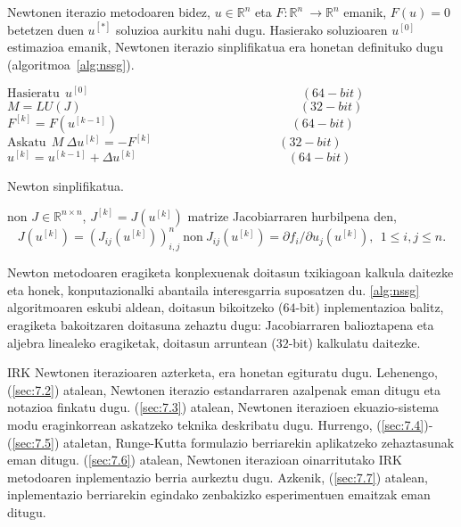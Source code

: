 Newtonen iterazio metodoaren bidez, $u\in \mathbb{R}^{n}$ eta $F: \mathbb{R}^n \ \longrightarrow {\mathbb{R}}^n$ emanik, $F(u)=0$ betetzen duen $u^{[*]}$ soluzioa aurkitu nahi dugu. Hasierako soluzioaren $u^{[0]}$ estimazioa  emanik,  Newtonen iterazio sinplifikatua era honetan definituko dugu (algoritmoa~\ref{alg:nssg}).

\begin{algorithm}[H]
  \BlankLine
  $ \text{Hasieratu} \ \ u^{[0]}   \quad \quad \quad \quad \quad \quad \quad \quad\quad \quad \quad \quad \quad \quad \quad \quad \quad    (64-bit)$\;
  $M=LU(J) \ \ \quad \quad \quad \quad \quad \quad \quad \quad\quad \quad \quad \quad \quad \quad \quad \quad \quad    (32-bit)$\;
  {
   \BlankLine
   $F^{[k]}=F(u^{[k-1]}) \  \quad \ \quad \quad \quad \quad \quad \quad \quad \quad \quad \quad \quad \quad \ \   (64-bit)$\;
   $\text{Askatu} \ \ M \ \Delta u^{[k]}=- F^{[k]} \ \quad \ \quad \quad \quad \quad \quad \quad \quad \quad \ \ \  (32-bit)$\;
   \BlankLine
   $u^{[k]}=u^{[k-1]}+\Delta u^{[k]}  \ \ \ \quad \quad \quad \quad\quad \quad \quad \quad \quad \quad \quad \ \     (64-bit)$\;
  }
 \caption{Newton sinplifikatua.}
 \label{alg:nssg}
\end{algorithm}

non $J \in \mathbb{R}^{n \times n}$, $J^{[k]}=J(u^{[k]})$ matrize Jacobiarraren hurbilpena den,
\begin{equation*}
J(u^{[k]})=(J_{ij}(u^{[k]}))_{i,j}^n \ \text{non} \ J_{ij}(u^{[k]})=\partial f_i/\partial u_j (u^{[k]}), \ \ 1 \leq i,j \leq n. 
\end{equation*} 


Newton metodoaren eragiketa konplexuenak doitasun txikiagoan kalkula daitezke \cite{Baboulin20092526} eta honek, konputazionalki abantaila interesgarria suposatzen du. \ref{alg:nssg} algoritmoaren  eskubi aldean, doitasun bikoitzeko ($64$-bit) inplementazioa balitz, eragiketa bakoitzaren doitasuna zehaztu dugu: Jacobiarraren balioztapena eta aljebra linealeko eragiketak, doitasun arruntean ($32$-bit) kalkulatu daitezke.

IRK Newtonen iterazioaren azterketa, era honetan egituratu dugu. Lehenengo, (\ref{sec:7.2}) atalean, Newtonen iterazio estandarraren azalpenak eman ditugu eta notazioa finkatu dugu. (\ref{sec:7.3}) atalean, Newtonen iterazioen ekuazio-sistema modu eraginkorrean askatzeko teknika deskribatu dugu. Hurrengo, (\ref{sec:7.4})-(\ref{sec:7.5}) ataletan, Runge-Kutta formulazio berriarekin aplikatzeko zehaztasunak eman ditugu. (\ref{sec:7.6}) atalean, Newtonen iterazioan oinarritutako IRK metodoaren inplementazio berria aurkeztu dugu. Azkenik, (\ref{sec:7.7}) atalean, inplementazio berriarekin egindako zenbakizko esperimentuen emaitzak eman ditugu. 

